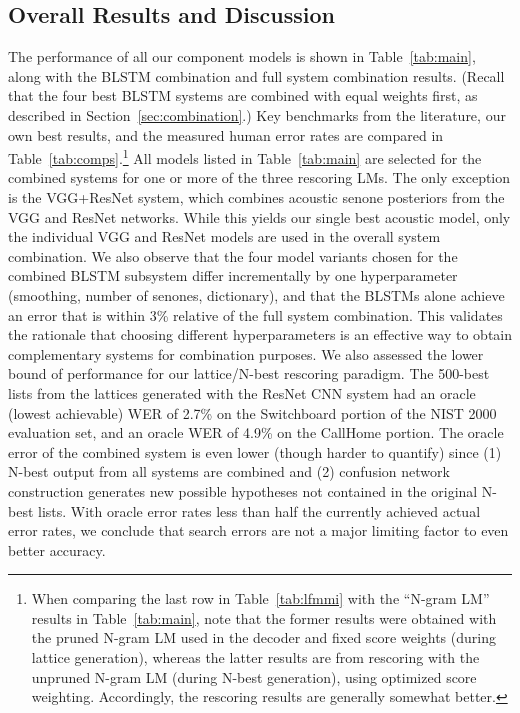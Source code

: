 \documentclass{article}
\begin{document}
\subsection{Overall Results and Discussion}
\label{sec:compare}
The performance of all our component models 
is shown in Table~\ref{tab:main}, along with the BLSTM combination and full system combination results.
(Recall that the four best BLSTM systems are combined with equal weights first,
as described in Section~\ref{sec:combination}.)
Key benchmarks from the literature, our own best results, and the measured human error rates are compared in
Table~\ref{tab:comps}.\footnote{When comparing the last row in Table~\ref{tab:lfmmi} with the ``N-gram LM'' results in Table~\ref{tab:main},
note that the former results were obtained with the pruned N-gram LM used in the decoder and
fixed score weights (during lattice generation),
whereas the latter results are from rescoring with the unpruned N-gram LM (during N-best generation),
using optimized score weighting.  Accordingly, the rescoring results are generally somewhat better.}
All models listed in Table~\ref{tab:main} are selected for the combined systems
for one or more of the three rescoring LMs.
The only exception is the VGG+ResNet system, which combines acoustic senone posteriors from the VGG and ResNet networks.
While this yields our single best acoustic model, only the individual VGG and ResNet models are used in the
overall system combination.
We also observe that the four model variants chosen for the combined BLSTM subsystem differ incrementally by
one hyperparameter (smoothing, number of senones, dictionary), and that the BLSTMs alone achieve an error
that is within 3\% relative of the full system combination.
This validates the rationale that choosing different hyperparameters is an effective way to obtain complementary
systems for combination purposes.
We also assessed the lower bound of performance for our lattice/N-best rescoring paradigm.
The 500-best lists from the lattices generated with the ResNet CNN system
had an oracle (lowest achievable) WER of 2.7\% on the Switchboard portion of the NIST 2000 evaluation set,
and an oracle WER of 4.9\% on the CallHome portion.
The oracle error of the combined system is even lower (though harder to quantify) since (1) N-best output from all 
systems are combined and (2) confusion network construction generates new possible hypotheses not contained
in the original N-best lists.
With oracle error rates less than half the currently achieved actual error rates,
we conclude that search errors are not a major limiting factor to even better accuracy.
\end{document}
